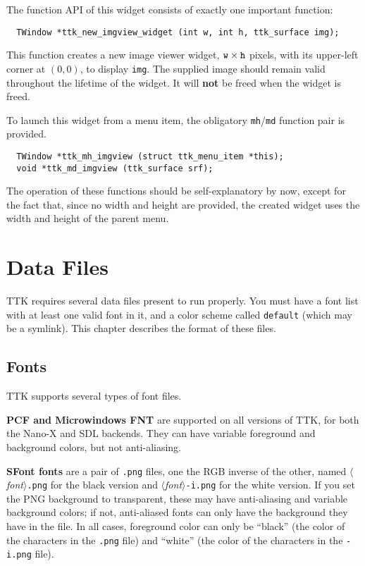 \documentclass[12pt,letterpaper]{report}
\def\<#1>{\leavevmode\hbox{$\langle${\sl#1\/}$\rangle$}}
\begin{document}
The function API of this widget consists of exactly one important function:
\begin{verbatim}
  TWindow *ttk_new_imgview_widget (int w, int h, ttk_surface img);
\end{verbatim}
This function creates a new image viewer widget, $\verb|w| \times \verb|h|$ pixels, with its upper-left corner
at $(0,0)$, to display \verb|img|. The supplied image should remain valid throughout the lifetime of the widget.
It will {\bf not} be freed when the widget is freed.

To launch this widget from a menu item, the obligatory \verb|mh|/\verb|md| function pair is provided.
\begin{verbatim}
  TWindow *ttk_mh_imgview (struct ttk_menu_item *this);
  void *ttk_md_imgview (ttk_surface srf);
\end{verbatim}
The operation of these functions should be self-explanatory by now, except for the fact that, since no width
and height are provided, the created widget uses the width and height of the parent menu.

\chapter{Data Files}
TTK requires several data files present to run properly. You must have a font list with at least one valid
font in it, and a color scheme called \verb|default| (which may be a symlink). This chapter describes
the format of these files.

\section{Fonts}
TTK supports several types of font files.

{\bf PCF and Microwindows FNT} are supported on all versions of TTK, for both the Nano-X and SDL backends. They
can have variable foreground and background colors, but not anti-aliasing.

{\bf SFont fonts} are a pair of \verb|.png| files, one the RGB inverse of the other, named \<font>\verb|.png| for
the black version and \<font>\verb|-i.png| for the white version. If you set the PNG background to transparent,
these may have anti-aliasing and variable background colors; if not, anti-aliased fonts can only have the
background they have in the file. In all cases, foreground color can only be ``black'' (the color of the characters in the \verb|.png| file)
and ``white'' (the color of the characters in the \verb|-i.png| file).
\end{document}
